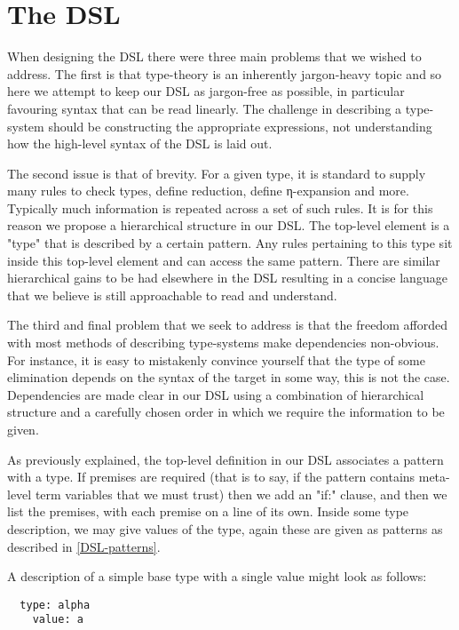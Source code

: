 \section{The DSL}
\label{DSL}

When designing the DSL there were three main problems that we wished to
address. The first is that
type-theory is an inherently jargon-heavy topic and so here we attempt
to keep our DSL as jargon-free as possible, in particular favouring
syntax that can be read linearly. The challenge in describing a
type-system should be constructing the appropriate expressions,
not understanding how the high-level syntax of the DSL is laid out.

The second issue is that of brevity. For a given type, it is standard
to supply many rules to check types, define reduction,
define η-expansion and more. Typically much information is
repeated across a set of such rules. It is for this reason we propose
a hierarchical structure in our DSL. The top-level element is a "type"
that is described by a certain pattern. Any rules pertaining to this
type sit inside this top-level element and can access the same
pattern. There are similar hierarchical gains to be had elsewhere in
the DSL resulting in a concise language that we believe is still
approachable to read and understand.

The third and final problem that we seek to address is that the
freedom afforded with most methods of describing type-systems make
dependencies non-obvious. For instance, it is easy to mistakenly
convince yourself that the type of some elimination depends on the
syntax of the target in some way, this is not the case. Dependencies
are made clear in our DSL using a combination of hierarchical
structure and a carefully chosen order in which we require the
information to be given.

As previously explained, the top-level definition in our DSL
associates a pattern with a type. If premises are required (that is
to say, if the pattern contains meta-level term variables that we must
trust) then we add an "if:" clause, and then we list the premises,
with each premise on a line of its own. Inside some type description,
we may give values of the type, again these are given as patterns as
described in \ref{DSL-patterns}.

A description of a simple base type with a single value might look as
follows:

\begin{BVerbatim}
  type: alpha
    value: a
\end{BVerbatim}

